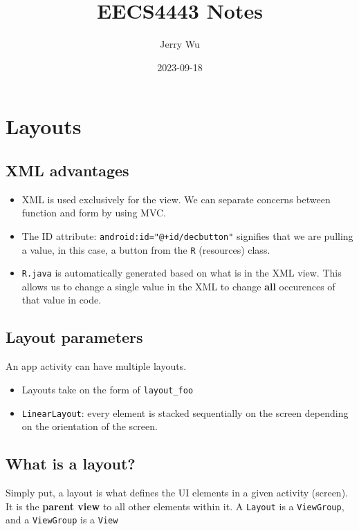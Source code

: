 \documentclass[12pt]{book}
\title{EECS4443 Notes}
\author{Jerry Wu}
\date{2023-09-18}
\begin{document}
\maketitle

\section*{Layouts}

\subsection*{XML advantages}


\begin{itemize}
    \item XML is used exclusively for the view. We can separate concerns between function and form by using MVC.
    \item The ID attribute: \texttt{android:id="@+id/decbutton"} signifies that we are pulling a value, in this case, a button from the \texttt{R} (resources) class. 
    \item \texttt{R.java} is automatically generated based on what is in the XML view. This allows us to change a single value in the XML to change \textbf{all} occurences of that value in code.
\end{itemize}

\subsection*{Layout parameters}
An app activity can have multiple layouts.
\begin{itemize}
  \item Layouts take on the form of \texttt{layout\_foo}
  \item \texttt{LinearLayout}: every element is stacked sequentially on the screen depending on the orientation of the screen.
\end{itemize}

\subsection*{What is a layout?}
Simply put, a layout is what defines the UI elements in a given activity (screen). It is the \textbf{parent view} to all other elements within it. A \texttt{Layout} is a \texttt{ViewGroup}, and a \texttt{ViewGroup} is a \texttt{View}
\end{document}
